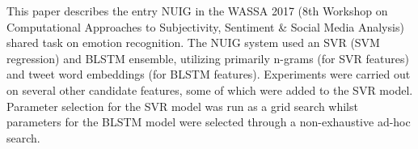 This paper describes the entry NUIG in the WASSA 2017 (8th Workshop on Computational Approaches to Subjectivity, Sentiment \& Social Media Analysis) shared task on emotion recognition. The NUIG system used an SVR (SVM regression) and BLSTM ensemble, utilizing primarily n-grams (for SVR features) and tweet word embeddings (for BLSTM features). Experiments were carried out on several other candidate features, some of which were added to the SVR model. Parameter selection for the SVR model was run as a grid search whilst parameters for the BLSTM model were selected through a non-exhaustive ad-hoc search.
